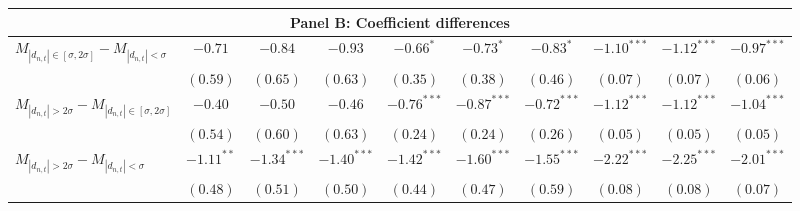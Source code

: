 \begin{tabular}{lccccccccc}
   \hline \multicolumn{10}{c}{Panel B: Coefficient differences} \\
 \hline$M_{|d_{n,t}| \in [\sigma, 2\sigma]} - M_{|d_{n,t}| < \sigma}$ & $-0.71$ & $-0.84$ & $-0.93$ & $-0.66^{*}$ & $-0.73^{*}$ & $-0.83^{*}$ & $-1.10^{***}$ & $-1.12^{***}$ & $-0.97^{***}$ \\ 
   & $(0.59)$ & $(0.65)$ & $(0.63)$ & $(0.35)$ & $(0.38)$ & $(0.46)$ & $(0.07)$ & $(0.07)$ & $(0.06)$ \\ 
  $M_{|d_{n,t}| > 2 \sigma} - M_{|d_{n,t}| \in [\sigma, 2\sigma]}$ & $-0.40$ & $-0.50$ & $-0.46$ & $-0.76^{***}$ & $-0.87^{***}$ & $-0.72^{***}$ & $-1.12^{***}$ & $-1.12^{***}$ & $-1.04^{***}$ \\ 
   & $(0.54)$ & $(0.60)$ & $(0.63)$ & $(0.24)$ & $(0.24)$ & $(0.26)$ & $(0.05)$ & $(0.05)$ & $(0.05)$ \\ 
  $M_{|d_{n,t}| > 2 \sigma} - M_{|d_{n,t}| < \sigma}$ & $-1.11^{**}$ & $-1.34^{***}$ & $-1.40^{***}$ & $-1.42^{***}$ & $-1.60^{***}$ & $-1.55^{***}$ & $-2.22^{***}$ & $-2.25^{***}$ & $-2.01^{***}$ \\ 
   & $(0.48)$ & $(0.51)$ & $(0.50)$ & $(0.44)$ & $(0.47)$ & $(0.59)$ & $(0.08)$ & $(0.08)$ & $(0.07)$ \\ 
   \hline 
\end{tabular}
